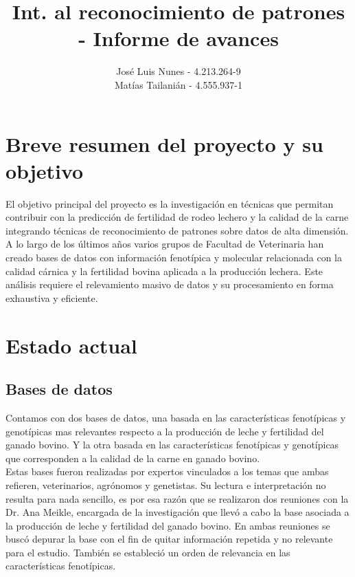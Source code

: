 \documentclass[11pt,a4paper]{article}
\author{José Luis Nunes - 4.213.264-9 \\ Matías Tailanián - 4.555.937-1}
\title{Int. al reconocimiento de patrones - Informe de avances}
\date{}
\begin{document}
\maketitle

\section{Breve resumen del proyecto y su objetivo}

El objetivo principal del proyecto es la investigación en técnicas que permitan contribuir con la predicción de fertilidad de rodeo lechero y la calidad de la carne integrando técnicas de reconocimiento de patrones sobre datos de alta dimensión.\\

A lo largo de los últimos años varios grupos de Facultad de Veterinaria han creado bases de datos con información fenotípica y molecular relacionada con la calidad cárnica y la fertilidad bovina aplicada a la producción lechera. Este análisis requiere el relevamiento masivo de datos y su procesamiento en forma exhaustiva y eficiente. \\

\section{Estado actual}
\subsection{Bases de datos}

Contamos con dos bases de datos, una basada en las características fenotípicas y genotípicas mas relevantes respecto a la producción de leche y fertilidad del ganado bovino. Y la otra basada en las características fenotípicas y genotípicas que corresponden a la calidad de la carne en ganado bovino.\\

Estas bases fueron realizadas por expertos vinculados a los temas que ambas refieren, veterinarios, agrónomos y genetistas. Su lectura e interpretación no resulta para nada sencillo, es por esa razón que se realizaron dos reuniones con la Dr. Ana Meikle, encargada de la investigación que llevó a cabo la base asociada a la producción de leche y fertilidad del ganado bovino. En ambas reuniones se buscó depurar la base con el fin de quitar información repetida y no relevante para el estudio. También se estableció un orden de relevancia en las características fenotípicas.\\
\end{document}
